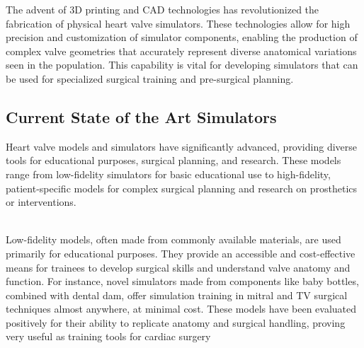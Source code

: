 The advent of 3D printing and \gls{CAD} technologies has revolutionized the fabrication of physical heart valve simulators. These technologies allow for high precision and customization of simulator components, enabling the production of complex valve geometries that accurately represent diverse anatomical variations seen in the population. This capability is vital for developing simulators that can be used for specialized surgical training and pre-surgical planning.

\subsection{Current State of the Art Simulators}

Heart valve models and simulators have significantly advanced, providing diverse tools for educational purposes, surgical planning, and research. These models range from low-fidelity simulators for basic educational use to high-fidelity, patient-specific models for complex surgical planning and research on prosthetics or interventions.

\\
Low-fidelity models, often made from commonly available materials, are used primarily for educational purposes. They provide an accessible and cost-effective means for trainees to develop surgical skills and understand valve anatomy and function. For instance, novel simulators made from components like baby bottles, combined with dental dam, offer simulation training in mitral and \gls{TV} surgical techniques almost anywhere, at minimal cost. These models have been evaluated positively for their ability to replicate anatomy and surgical handling, proving very useful as training tools for cardiac surgery ~\\

